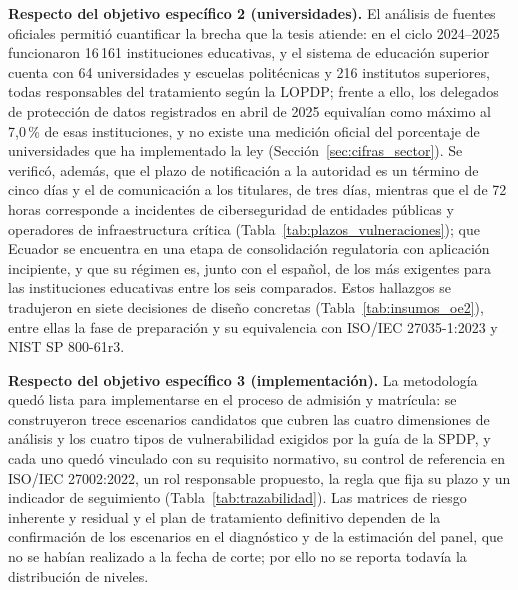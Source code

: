 \textbf{Respecto del objetivo específico 2 (universidades).} El análisis de fuentes oficiales permitió cuantificar la brecha que la tesis atiende: en el ciclo 2024--2025 funcionaron 16\,161 instituciones educativas, y el sistema de educación superior cuenta con 64 universidades y escuelas politécnicas y 216 institutos superiores, todas responsables del tratamiento según la LOPDP; frente a ello, los delegados de protección de datos registrados en abril de 2025 equivalían como máximo al 7,0\,\% de esas instituciones, y no existe una medición oficial del porcentaje de universidades que ha implementado la ley (Sección~\ref{sec:cifras_sector}). Se verificó, además, que el plazo de notificación a la autoridad es un término de cinco días y el de comunicación a los titulares, de tres días, mientras que el de 72 horas corresponde a incidentes de ciberseguridad de entidades públicas y operadores de infraestructura crítica (Tabla~\ref{tab:plazos_vulneraciones}); que Ecuador se encuentra en una etapa de consolidación regulatoria con aplicación incipiente, y que su régimen es, junto con el español, de los más exigentes para las instituciones educativas entre los seis comparados. Estos hallazgos se tradujeron en siete decisiones de diseño concretas (Tabla~\ref{tab:insumos_oe2}), entre ellas la fase de preparación y su equivalencia con ISO/IEC 27035-1:2023 y NIST SP 800-61r3.

\textbf{Respecto del objetivo específico 3 (implementación).} La metodología quedó lista para implementarse en el proceso de admisión y matrícula: se construyeron trece escenarios candidatos que cubren las cuatro dimensiones de análisis y los cuatro tipos de vulnerabilidad exigidos por la guía de la SPDP, y cada uno quedó vinculado con su requisito normativo, su control de referencia en ISO/IEC 27002:2022, un rol responsable propuesto, la regla que fija su plazo y un indicador de seguimiento (Tabla~\ref{tab:trazabilidad}). Las matrices de riesgo inherente y residual y el plan de tratamiento definitivo dependen de la confirmación de los escenarios en el diagnóstico y de la estimación del panel, que no se habían realizado a la fecha de corte; por ello no se reporta todavía la distribución de niveles.

